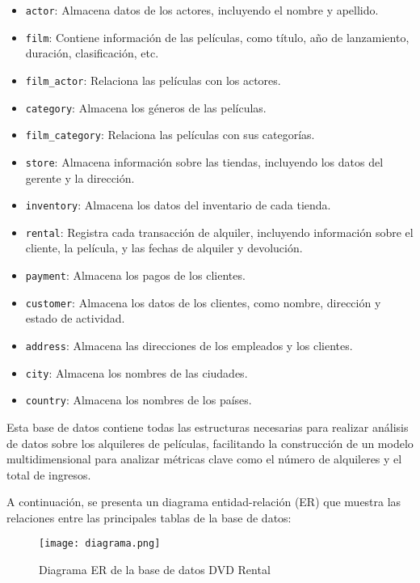 \documentclass{article}
\begin{document}
\begin{itemize}
    \item \texttt{actor}: Almacena datos de los actores, incluyendo el nombre y apellido.
    \item \texttt{film}: Contiene información de las películas, como título, año de lanzamiento, duración, clasificación, etc.
    \item \texttt{film\_actor}: Relaciona las películas con los actores.
    \item \texttt{category}: Almacena los géneros de las películas.
    \item \texttt{film\_category}: Relaciona las películas con sus categorías.
    \item \texttt{store}: Almacena información sobre las tiendas, incluyendo los datos del gerente y la dirección.
    \item \texttt{inventory}: Almacena los datos del inventario de cada tienda.
    \item \texttt{rental}: Registra cada transacción de alquiler, incluyendo información sobre el cliente, la película, y las fechas de alquiler y devolución.
    \item \texttt{payment}: Almacena los pagos de los clientes.
    \item \texttt{customer}: Almacena los datos de los clientes, como nombre, dirección y estado de actividad.
    \item \texttt{address}: Almacena las direcciones de los empleados y los clientes.
    \item \texttt{city}: Almacena los nombres de las ciudades.
    \item \texttt{country}: Almacena los nombres de los países.
\end{itemize}

Esta base de datos contiene todas las estructuras necesarias para realizar análisis de datos sobre los alquileres de películas, facilitando la construcción de un modelo multidimensional para analizar métricas clave como el número de alquileres y el total de ingresos.

A continuación, se presenta un diagrama entidad-relación (ER) que muestra las relaciones entre las principales tablas de la base de datos:

\begin{figure}[h]
    \centering
    \texttt{[image: diagrama.png]}
    \caption{Diagrama ER de la base de datos DVD Rental}
    \label{fig:diagrama-er}
\end{figure}
\end{document}
